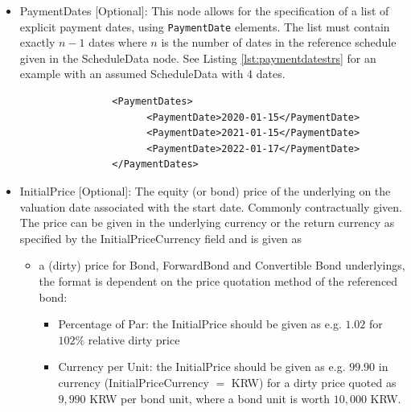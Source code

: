 \begin{itemize}
\begin{itemize}
  \item PaymentDates [Optional]: This node allows for the specification of a list of explicit payment dates, using
    \lstinline!PaymentDate! elements. The list must contain exactly $n-1$ dates where $n$ is the number of dates in the
    reference schedule given in the ScheduleData node. See Listing \ref{lst:paymentdatestrs} for an example with an
    assumed ScheduleData with 4 dates.
    
    \begin{listing}[H]
\begin{verbatim}
                <PaymentDates>
                      <PaymentDate>2020-01-15</PaymentDate>
                      <PaymentDate>2021-01-15</PaymentDate>
                      <PaymentDate>2022-01-17</PaymentDate>
                </PaymentDates>
\end{verbatim}
\caption{Payment dates}
\label{lst:paymentdatestrs}
\end{listing}
    
  \item InitialPrice [Optional]: The equity (or bond) price of the underlying
    on the valuation date associated with the start date. Commonly contractually given. The price can be given in the
    underlying currency or the return currency as specified by the InitialPriceCurrency field and is given as
    \begin{itemize}
    \item a (dirty) price for Bond, ForwardBond and Convertible Bond underlyings, the format is dependent on the price quotation method of the referenced bond:
      \begin{itemize}
      \item Percentage of Par: the InitialPrice should be given as e.g. $1.02$ for $102\%$ relative dirty price
      \item Currency per Unit: the InitialPrice should be given as e.g. $99.90$ in currency (InitialPriceCurrency $=$ KRW)
        for a dirty price quoted as $9{,}990$ KRW per bond unit, where a bond unit is worth $10{,}000$ KRW.
        

\end{itemize}
\end{itemize}
\end{itemize}
\end{itemize}
